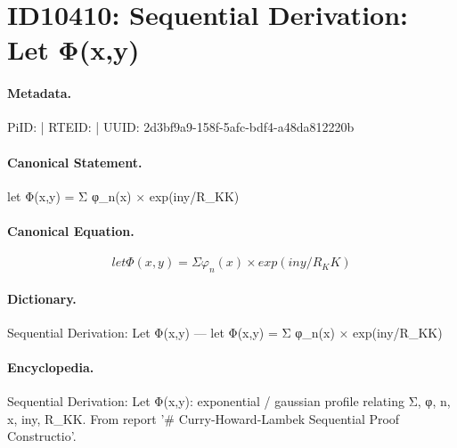 \section*{ID10410: Sequential Derivation: Let Φ(x,y)}
\paragraph{Metadata.}
PiID:  | RTEID:  | UUID: 2d3bf9a9-158f-5afc-bdf4-a48da812220b

\paragraph{Canonical Statement.}
let Φ(x,y) = Σ φ\_n(x) × exp(iny/R\_KK)

\paragraph{Canonical Equation.}
\[
let Φ(x,y) = Σ φ_n(x) × exp(iny/R_KK)
\]

\paragraph{Dictionary.}
Sequential Derivation: Let Φ(x,y) — let Φ(x,y) = Σ φ\_n(x) × exp(iny/R\_KK)

\paragraph{Encyclopedia.}
Sequential Derivation: Let Φ(x,y): exponential / gaussian profile relating Σ, φ, n, x, iny, R\_KK. From report '\# Curry-Howard-Lambek Sequential Proof Constructio'.
